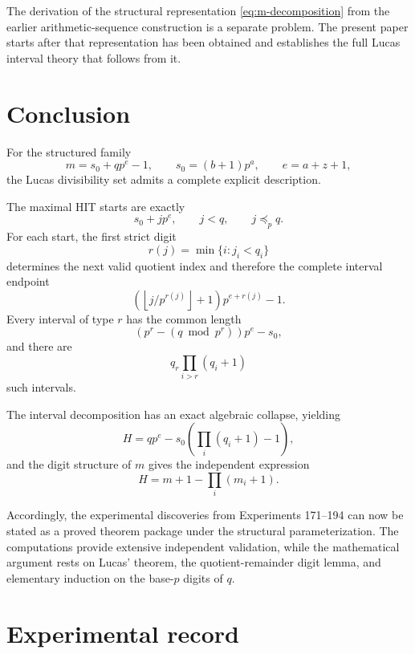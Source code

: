 \documentclass[11pt,a4paper]{article}
\theoremstyle{definition}
\theoremstyle{remark}
\newcommand{\floor}[1]{\left\lfloor #1\right\rfloor}
\begin{document}
The derivation of the structural representation \eqref{eq:m-decomposition} from the earlier arithmetic-sequence construction is a separate problem.  The present paper starts after that representation has been obtained and establishes the full Lucas interval theory that follows from it.

\section{Conclusion}

For the structured family
\[
m=s_0+qp^e-1,
\qquad
s_0=(b+1)p^a,
\qquad
 e=a+z+1,
\]
the Lucas divisibility set admits a complete explicit description.

The maximal HIT starts are exactly
\[
s_0+jp^e,
\qquad
j<q,
\qquad
j\preceq_p q.
\]
For each start, the first strict digit
\[
r(j)=\min\{i:j_i<q_i\}
\]
determines the next valid quotient index and therefore the complete interval endpoint
\[
\left(\floor{j/p^{r(j)}}+1\right)p^{e+r(j)}-1.
\]
Every interval of type $r$ has the common length
\[
\left(p^r-(q\bmod p^r)\right)p^e-s_0,
\]
and there are
\[
q_r\prod_{i>r}(q_i+1)
\]
such intervals.

The interval decomposition has an exact algebraic collapse, yielding
\[
H=qp^e-s_0\left(\prod_i(q_i+1)-1\right),
\]
and the digit structure of $m$ gives the independent expression
\[
\boxed{H=m+1-\prod_i(m_i+1)}.
\]

Accordingly, the experimental discoveries from Experiments 171--194 can now be stated as a proved theorem package under the structural parameterization.  The computations provide extensive independent validation, while the mathematical argument rests on Lucas' theorem, the quotient-remainder digit lemma, and elementary induction on the base-$p$ digits of $q$.

\section{Experimental record}
\end{document}
